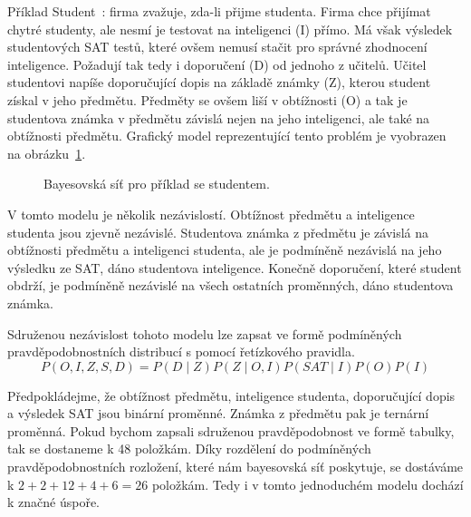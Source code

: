 Příklad Student~\cite{koller2009probabilistic}: firma zvažuje, zda-li přijme studenta.
Firma chce přijímat chytré studenty, ale nesmí je testovat na inteligenci (I) přímo.
Má však výsledek studentových SAT testů, které ovšem nemusí stačit pro správné zhodnocení inteligence.
Požadují tak tedy i doporučení (D) od jednoho z učitelů.
Učitel studentovi napíše doporučující dopis na základě známky (Z), kterou student získal v jeho předmětu.
Předměty se ovšem liší v obtížnosti (O) a tak je studentova známka v předmětu závislá nejen na jeho inteligenci, ale také na obtížnosti předmětu.
Grafický model reprezentující tento problém je vyobrazen na obrázku~\ref{fig:student}.
\begin{figure}
\begin{center}
\end{center}
\label{fig:student}
\caption{Bayesovská síť pro příklad se studentem.}
\end{figure}

V tomto modelu je několik nezávislostí. Obtížnost předmětu a inteligence studenta jsou zjevně nezávislé.
Studentova známka z předmětu je závislá na obtížnosti předmětu a inteligenci studenta, ale je podmíněně nezávislá na jeho výsledku ze SAT, dáno studentova inteligence.
Konečně doporučení, které student obdrží, je podmíněně nezávislé na všech ostatních proměnných, dáno studentova známka.

Sdruženou nezávislost tohoto modelu lze zapsat ve formě podmíněných pravděpodobnostních distribucí s pomocí řetízkového pravidla.
\begin{equation}
P(O, I, Z, S, D) = P(D \mid Z) P(Z \mid O, I) P(SAT \mid I) P(O) P(I)
\end{equation}

Předpokládejme, že obtížnost předmětu, inteligence studenta, doporučující dopis a výsledek SAT jsou binární proměnné.
Známka z předmětu pak je ternární proměnná.
Pokud bychom zapsali sdruženou pravděpodobnost ve formě tabulky, tak se dostaneme k 48 položkám.
Díky rozdělení do podmíněných pravděpodobnostních rozložení, které nám bayesovská síť poskytuje, se dostáváme k $2 + 2 + 12 + 4 + 6 = 26$ položkám.
Tedy i v tomto jednoduchém modelu dochází k značné úspoře.

